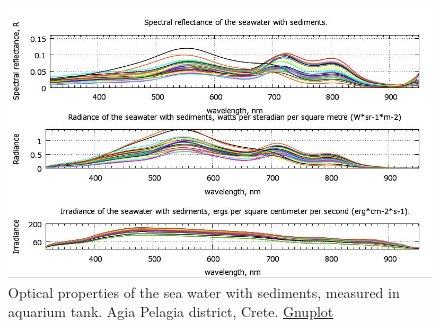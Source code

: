 \documentclass[10pt, a4paper]{article}
\begin{document}
\begin{figure}[h]
	\centering
	\includegraphics[scale=0.5]{GNU-17.jpg}
	\caption{Optical properties of the sea water with sediments, measured in aquarium tank. Agia Pelagia district, Crete. \href{http://www.gnuplot.info/}				{Gnuplot}}\label{fig:4.2}
\end{figure}
\pagebreak
\end{document}
